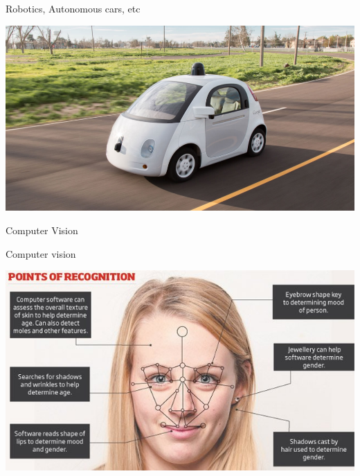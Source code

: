 \documentclass{beamer}
\begin{document}
\begin{frame}{Robotics, Autonomous cars, etc}


\begin{center}
\includegraphics[width=.9\textwidth,keepaspectratio=true]{figs/autonomousCar}
\end{center}

\end{frame}

\begin{frame}{Computer Vision}

Computer vision
  
\begin{center}
\includegraphics[width=.9\textwidth]{figs/FaceRecognition}
\end{center}

\end{frame}
\end{document}
